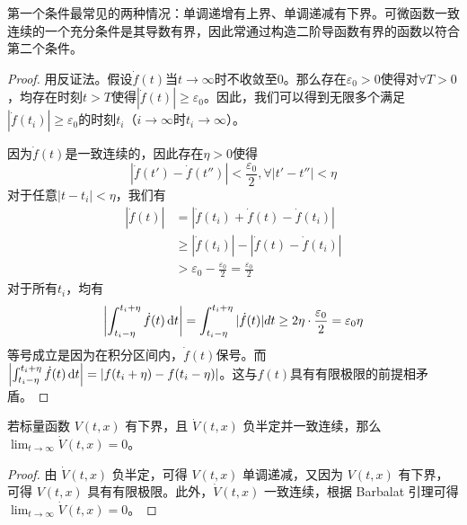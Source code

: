 \begin{note}
  第一个条件最常见的两种情况：单调递增有上界、单调递减有下界。可微函数一致连续的一个充分条件是其导数有界，因此常通过构造二阶导函数有界的函数以符合第二个条件。
\end{note}
\begin{proof}
  用反证法。假设$\dot{f}(t)$当$t\to\infty$时不收敛至$0$。那么存在$\varepsilon_0>0$使得对$\forall T>0$，均存在时刻$t>T$使得$|\dot{f}(t)|\ge \varepsilon_0$。因此，我们可以得到无限多个满足$|\dot{f}(t_i)|\ge \varepsilon_0$的时刻$t_i$（$i\to\infty$时$t_i\to\infty$）。

  因为$\dot{f}(t)$是一致连续的，因此存在$\eta>0$使得
  \[|\dot{f}(t')-\dot{f}(t'')|<\frac{\varepsilon_0}{2},\forall |t'-t''|<\eta\]
  对于任意$|t-t_i|<\eta$，我们有
  \begin{align*}
    |\dot{f}(t)|&= |\dot{f}(t_i)+\dot{f}(t)-\dot{f}(t_i)|\\
    &\ge |\dot{f}(t_i)|- |\dot{f}(t)-\dot{f}(t_i)|\\
    &>\varepsilon_0-\frac{\varepsilon_0}{2}=\frac{\varepsilon_0}{2}
  \end{align*}
  对于所有$t_i$，均有
  \[\left|\int_{t_i-\eta}^{t_i+\eta}\dot{f}(t)\mathop{}\!\mathrm{d} t\right|=\int_{t_i-\eta}^{t_i+\eta}|\dot{f}(t)|dt\geq2\eta\cdot\frac{\varepsilon_{0}}{2}=\varepsilon_{0}\eta\]
  等号成立是因为在积分区间内，$\dot{f}(t)$保号。而$\left|\int_{t_i-\eta}^{t_i+\eta}\dot{f}(t)\mathop{}\!\mathrm{d} t\right|=|f(t_i+\eta)-f(t_i-\eta)|$。这与$f(t)$具有有限极限的前提相矛盾。
\end{proof}
\begin{theorem}\label{Lyapunov-like}
  若标量函数 $V(t, x)$ 有下界，且 $\dot{V}(t, x)$ 负半定并一致连续，那么 $\lim_{t \to \infty} \dot{V}(t, x) = 0$。
\end{theorem}
\begin{proof}
  由 $\dot{V}(t, x)$ 负半定，可得 $V (t, x)$ 单调递减，又因为 $V(t, x)$ 有下界，可得 $V (t, x)$ 具有有限极限。此外，$\dot{V}(t, x)$ 一致连续，根据 Barbalat 引理可得 $\lim_{t \to \infty} \dot{V}(t, x) = 0$。
\end{proof}
